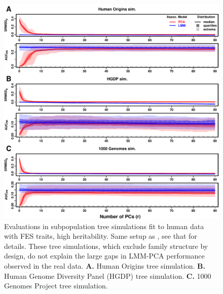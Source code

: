 \documentclass[9pt,lineno]{elife}
\begin{document}
\begin{figure}
  \begin{fullwidth}
    \includegraphics[width=\linewidth,height=\textheight,keepaspectratio]{fes/rmsd-auc-real-sim.pdf}
    \caption{
      Evaluations in subpopulation tree simulations fit to human data with FES traits, high heritability.
      Same setup as , see that for details.
      These tree simulations, which exclude family structure by design, do not explain the large gaps in LMM-PCA performance observed in the real data.
      \textbf{A.}
      Human Origins tree simulation.
      \textbf{B.}
      Human Genome Diversity Panel (HGDP) tree simulation.
      \textbf{C.}
      1000 Genomes Project tree simulation.
    }
    \label{fig:rmsd-auc-real-sim}
\end{fullwidth}
\end{figure}
\end{document}
